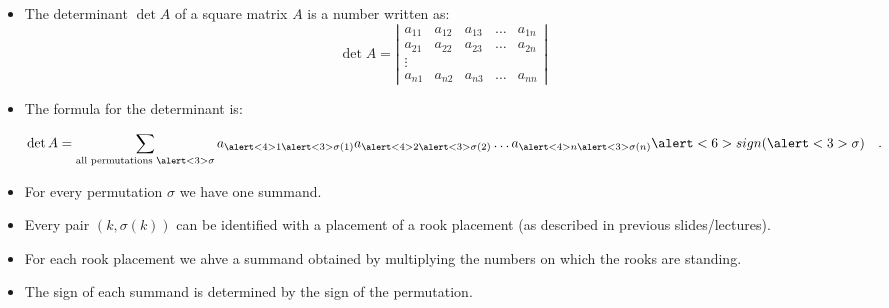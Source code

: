 \begin{frame}

\begin{itemize}
\item The determinant $\det A$ of a square matrix $A$ is a number written as:
\[
\det A= \left|\begin{array}{ccccc}
a_{11} & a_{12} & a_{13}& \dots & a_{1n}\\
a_{21} & a_{22} & a_{23}& \dots & a_{2n}\\
\vdots \\
a_{n1} & a_{n2} & a_{n3}& \dots & a_{nn}
\end{array} \right|
\]
\item<2-> The formula for the determinant is:

\[\det A=\sum_{\text{all permutations }\alert<3>{\sigma}} a_{\alert<4>{1\alert<3>{\sigma}(1)}} a_{\alert<4>{2\alert<3>{\sigma}(2)}} \dots a_{\alert<4>{n\alert<3>{\sigma}(n)}} \alert<6>{ sign(\alert<3>{\sigma})} \quad .
\]
\item<3-> For every permutation $\sigma$ we have one summand.
\item<4-> Every pair $(k,\sigma(k))$ can be identified with a placement of a rook placement (as described in previous slides/lectures).
\item<5-> For each rook placement we ahve a summand obtained by multiplying the numbers on which the rooks are standing.
\item<6-> The sign of each summand is determined by the sign of the permutation.
\end{itemize}

\vskip 10cm
\end{frame}
